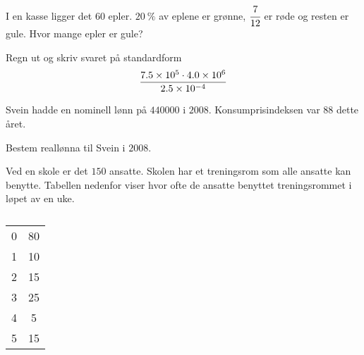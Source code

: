 


\Oppgave[2] %

I en kasse ligger det $60$ epler. $\SI{20}{\percent}$ av eplene er grønne,
$\cfrac{7}{12}$ er røde og resten er gule. Hvor mange epler er gule?


\Oppgave[2] %

Regn ut og skriv svaret på standardform
%
\begin{equation*}
    \frac{\num{7.5E5} \cdot \num{4.0E6}}{\num{2.5E-4}}
\end{equation*}


\Oppgave[2] %

Svein hadde en nominell lønn på $\num{440 000}$ i $2008$. Konsumprisindeksen var
$88$ dette året.  \bigskip\noindent

Bestem reallønna til Svein i $2008$.


\Oppgave[3] %

Ved en skole er det $150$ ansatte. Skolen har et treningsrom som alle ansatte
kan benytte. Tabellen nedenfor viser hvor ofte de ansatte benyttet
treningsrommet i løpet av en uke.

\begin{table}[H]
  \centering
  \caption{}
  \begin{tabular}{| S[table-format=2.0] | S[table-format=2.0] |}
    0 & 80 \\
    1 & 10 \\
    2 & 15 \\
    3 & 25 \\
    4 &  5 \\
    5 & 15 \\ \hline
  \end{tabular}
  \label{tab:del-1-oppgave-1.4}
\end{table}

\Oppgave[2] %

\begin{figure}[H]
  \centering
  \caption{}
  \label{fig:del-1-oppgave-1-5}
\end{figure}

